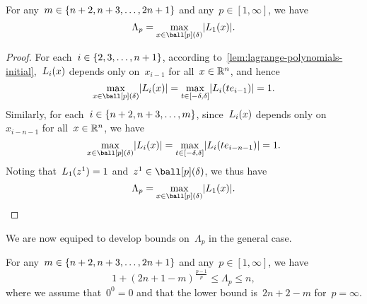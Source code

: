 \begin{lemma}
    \label{lem:lambda-poisedness-initial-simple}
    For any~$m \in \{n + 2, n + 3, \dots, 2n + 1\}$ and any~$p \in [1, \infty]$, we have
    \begin{equation}
        \label{eq:lambda-poisedness-initial-simple}
        \Lambda_p = \max_{\iter \in \ball[p](\delta)} \abs{\lagp[1](\iter)}.
    \end{equation}
\end{lemma}

\begin{proof}
    For each~$i \in \{2, 3, \dots, n + 1\}$, according to~\cref{lem:lagrange-polynomials-initial},~$\lagp[i](\iter)$ depends only on~$x_{i - 1}$ for all~$\iter \in \R^n$, and hence
    \begin{equation*}
        \max_{\iter \in \ball[p](\delta)} \abs{\lagp[i](\iter)} = \max_{t \in [-\delta, \delta]} \abs{\lagp[i](t e_{i - 1})} = 1.
    \end{equation*}
    Similarly, for each~$i \in \{n + 2, n + 3, \dots, m\}$, since~$\lagp[i](\iter)$ depends only on~$x_{i - n - 1}$ for all~$\iter \in \R^n$, we have
    \begin{equation*}
        \max_{\iter \in \ball[p](\delta)} \abs{\lagp[i](\iter)} = \max_{t \in [-\delta, \delta]} \abs{\lagp[i](t e_{i - n - 1})} = 1.
    \end{equation*}
    Noting that~$\lagp[1](z^1) = 1$ and~$z^1 \in \ball[p](\delta)$, we thus have
    \begin{equation*}
        \Lambda_p = \max_{\iter \in \ball[p](\delta)} \abs{\lagp[1](\iter)}.
    \end{equation*}
\end{proof}

We are now equiped to develop bounds on~$\Lambda_p$ in the general case.

\begin{theorem}
    \label{thm:lambda-poisedness-initial}
    For any~$m \in \{n + 2, n + 3, \dots, 2n + 1\}$ and any~$p \in [1, \infty]$, we have
    \begin{equation*}
        1 + (2n + 1 - m)^{\frac{p - 1}{p}} \le \Lambda_p \le n,
    \end{equation*}
    where we assume that~$0^0 = 0$ and that the lower bound is~$2n + 2 - m$ for~$p = \infty$.
\end{theorem}

